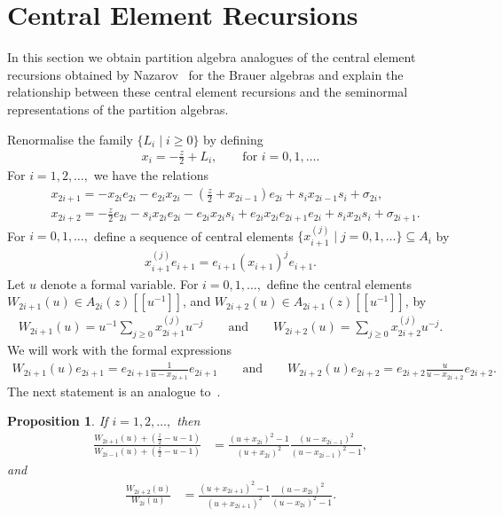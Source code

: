 \documentclass[11pt,a4paper,reqno,svgnames]{amsart}
\theoremstyle{plain}
\newtheorem{proposition}[theorem]{Proposition}
\theoremstyle{definition}
\numberwithin{equation}{section}
\begin{document}
\section{Central Element Recursions}\label{c-e-r-s}
In this section we obtain partition algebra analogues of the central element recursions obtained by Nazarov~\cite{MR1398116} for the Brauer algebras and explain the relationship between these central element recursions and the seminormal representations of the partition algebras. 

Renormalise the family $\lbrace L_i\mid i{\geqslant} 0\rbrace$ by defining 
\begin{align*}
x_{i}=-\textstyle{\frac{z}{2}}+L_{i},\qquad\text{for $i=0,1,\ldots.$}
\end{align*}
For $i=1,2,\ldots,$ we have the relations
\begin{align}
&x_{2i+1}=-x_{2i}e_{2i}-e_{2i}x_{2i}-({\textstyle\frac{z}{2}}+x_{2i-1})e_{2i}+s_ix_{2i-1}s_i+\sigma_{2i},\label{x-1-def}\\
&x_{2i+2}=-\textstyle{\frac{z}{2}}e_{2i}-s_ix_{2i}e_{2i}-e_{2i}x_{2i}s_i+e_{2i}x_{2i}e_{2i+1}e_{2i}+s_ix_{2i}s_i+\sigma_{2i+1}.\label{x-2-def}
\end{align}
For $i=0,1,\ldots,$  define a sequence of central elements $\{x^{(j)}_{i+1} \mid j=0,1,\ldots\} \subseteq A_i$ by 
\begin{align}\label{r-e-d}
x_{i+1}^{(j)}e_{i+1}=e_{i+1}(x_{i+1})^je_{i+1}. 
\end{align}
Let $u$ denote a formal variable. For $i=0,1,\dots,$  define the central elements $W_{2i+1}(u)\in A_{2i}(z)[[u^{-1}]]$, and $W_{2i+2}(u)\in A_{2i+1}(z)[[u^{-1}]]$, by 
\begin{align*}
W_{2i+1}(u)=u^{-1}\sum_{j{\geqslant}0} x_{2i+1}^{(j)}u^{-j}\qquad\text{and}\qquad W_{2i+2}(u)=\sum_{j{\geqslant}0} x_{2i+2}^{(j)}u^{-j}. 
\end{align*}
We will work with the formal expressions 
\begin{align*}
W_{2i+1}(u)e_{2i+1}=e_{2i+1}\frac{1}{u-x_{2i+1}}e_{2i+1}\qquad\text{and}\qquad{W_{2i+2}(u)}e_{2i+2}=e_{2i+2}\frac{u}{u-x_{2i+2}}e_{2i+2}.
\end{align*}
The next statement is an analogue to~\cite[Proposition~4.2]{MR1398116}. \begin{proposition}\label{n-1}
If $i=1,2,\ldots,$ then 
\begin{align}
\frac{W_{2i+1}(u)+(\frac{z}{2}-u-1)}{W_{2i-1}(u)+(\frac{z}{2}-u-1)}
&=\frac{(u+x_{2i})^2-1}{(u+x_{2i})^2}\frac{(u-x_{2i-1})^2}{(u-x_{2i-1})^2-1},\label{n-1-a} 
\end{align}
and
\begin{align}
\frac{W_{2i+2}(u)}{W_{2i}(u)}
&=\frac{(u+x_{2i+1})^2-1}{(u+x_{2i+1})^2}\frac{(u-x_{2i})^2}{(u-x_{2i})^2-1}.\label{n-1-b}
\end{align}
\end{proposition}
\end{document}
